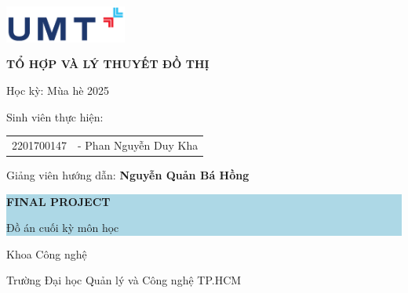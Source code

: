 \documentclass[12pt,a4paper]{article}
\begin{document}
\begin{titlepage}
    \centering
    
    \includegraphics[width=0.3\textwidth]{assets/logo_umt_value.png}
    \vspace{1cm}
    
    {\LARGE\bfseries TỔ HỢP VÀ LÝ THUYẾT ĐỒ THỊ\par}
    \vspace{0.5cm}
    
    {\Large Học kỳ: Mùa hè 2025\par}
    \vspace{1.5cm}
    
    {\large Sinh viên thực hiện:\par}
    \vspace{0.5cm}
    \begin{tabular}{ll}
        2201700147 & - Phan Nguyễn Duy Kha \\
    \end{tabular}
    
    \vspace{1cm}
    {\large Giảng viên hướng dẫn: \textbf{Nguyễn Quản Bá Hồng}\par}
    
    \vfill
    
    \colorbox{lightblue}{%
        \begin{minipage}{0.8\textwidth}
            \centering
            \vspace{1cm}
            {\Huge\bfseries FINAL PROJECT\par}
            \vspace{0.5cm}
            {\large Đồ án cuối kỳ môn học\par}
            \vspace{1cm}
        \end{minipage}
    }
    
    \vfill
    
    {\large Khoa Công nghệ\par}
    {\large Trường Đại học Quản lý và Công nghệ TP.HCM\par}
    
\end{titlepage}

\newpage
\thispagestyle{empty}
\end{document}
